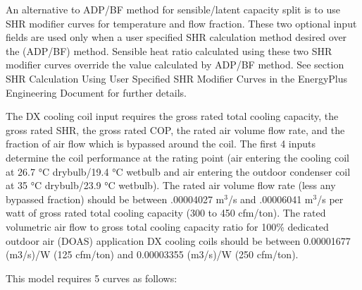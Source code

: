 An alternative to ADP/BF method for sensible/latent capacity split is to use SHR modifier curves for temperature and flow fraction. These two optional input fields are used only when a user specified SHR calculation method desired over the (ADP/BF) method. Sensible heat ratio calculated using these two SHR modifier curves override the value calculated by ADP/BF method. See section SHR Calculation Using User Specified SHR Modifier Curves in the EnergyPlus Engineering Document for further details.

The DX cooling coil input requires the gross rated total cooling capacity, the gross rated SHR, the gross rated COP, the rated air volume flow rate, and the fraction of air flow which is bypassed around the coil. The first 4 inputs determine the coil performance at the rating point (air entering the cooling coil at 26.7 °C drybulb/19.4 °C wetbulb and air entering the outdoor condenser coil at 35 °C drybulb/23.9 °C wetbulb). The rated air volume flow rate (less any bypassed fraction) should be between .00004027 m\(^{3}\)/s and .00006041 m\(^{3}\)/s per watt of gross rated total cooling capacity (300 to 450 cfm/ton). The rated volumetric air flow to gross total cooling capacity ratio for 100\% dedicated outdoor air (DOAS) application DX cooling coils should be between 0.00001677 (m3/s)/W (125 cfm/ton) and 0.00003355 (m3/s)/W (250 cfm/ton).

This model requires 5 curves as follows:

